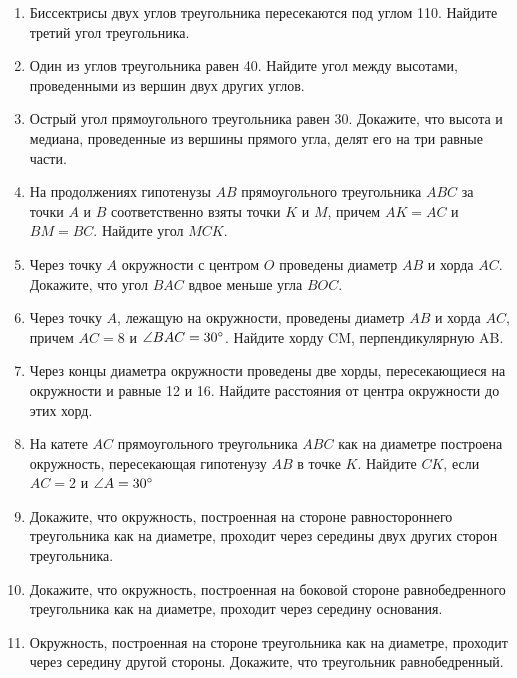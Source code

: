\documentclass[12pt, a4paper]{article}
\begin{document}
		

\begin{enumerate}
	\item Биссектрисы двух углов треугольника пересекаются под углом 110\degree. Найдите третий угол треугольника.
	\item Один из углов треугольника равен 40\degree. Найдите угол между высотами, проведенными из вершин двух других углов.
	\item Острый угол прямоугольного треугольника равен 30\degree. Докажите, что высота и медиана, проведенные из вершины прямого угла, делят его на три равные части.
	\item На продолжениях гипотенузы $AB$ прямоугольного треугольника $ABC$ за точки $A$ и $B$ соответственно взяты точки $K$ и $M$, причем $AK = AC$ и $BM = BC$. Найдите угол $MCK$.
	\item Через точку $A$ окружности с центром $O$ проведены диаметр $AB$ и хорда $AC$. Докажите, что угол $BAC$ вдвое меньше угла $BOC$.
	\item Через точку $A$, лежащую на окружности, проведены диаметр $AB$ и хорда $AC$, причем $AC = 8$ и $\angle BAC = 30\degree$. Найдите хорду CM, перпендикулярную AB.
	\item Через концы диаметра окружности проведены две хорды, пересекающиеся на окружности и равные 12 и 16. Найдите расстояния от центра окружности до этих хорд.
	\item На катете $AC$ прямоугольного треугольника $ABC$ как на диаметре построена окружность, пересекающая гипотенузу $AB$ в точке $K$. Найдите $CK$, если $AC = 2$ и $\angle A = 30\degree$
	\item Докажите, что окружность, построенная на стороне равностороннего треугольника как на диаметре, проходит через середины двух других сторон треугольника.
	\item Докажите, что окружность, построенная на боковой стороне равнобедренного треугольника как на диаметре, проходит через середину основания.
	\item Окружность, построенная на стороне треугольника как на диаметре, проходит через середину другой стороны. Докажите, что треугольник равнобедренный.
\end{enumerate}
\end{document}
